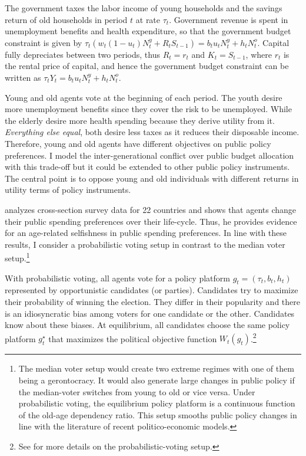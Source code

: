 \documentclass[
]{article}
\begin{document}
The government taxes the labor income of young households and the savings return of old households in period \(t\) at rate \(\tau_t\). Government revenue is spent in unemployment benefits and health expenditure, so that the government budget constraint is given by \(\tau_t\left( w_t(1-u_t)N^y_t + R_t S_{t-1} \right) = b_t u_t N^y_t + h_t N^o_t\). Capital fully depreciates between two periods, thus \(R_t = r_t\) and \(K_t = S_{t-1}\), where \(r_t\) is the rental price of capital, and hence the government budget constraint can be written as \(\tau_t Y_t = b_t u_t N^y_t + h_t N^o_t\).

Young and old agents vote at the beginning of each period. The youth desire more unemployment benefits since they cover the risk to be unemployed. While the elderly desire more health spending because they derive utility from it. \emph{Everything else equal}, both desire less taxes as it reduces their disposable income. Therefore, young and old agents have different objectives on public policy preferences. I model the inter-generational conflict over public budget allocation with this trade-off but it could be extended to other public policy instruments. The central point is to oppose young and old individuals with different returns in utility terms of policy instruments.

\citet{Sorensen2013} analyzes cross-section survey data for 22 countries and shows that agents change their public spending preferences over their life-cycle. Thus, he provides evidence for an age-related selfishness in public spending preferences. In line with these results, I consider a probabilistic voting setup in contrast to the median voter setup.\footnote{The median voter setup would create two extreme regimes with one of them being a gerontocracy. It would also generate large changes in public policy if the median-voter switches from young to old or vice versa. Under probabilistic voting, the equilibrium policy platform is a continuous function of the old-age dependency ratio. This setup smooths public policy changes in line with the literature of recent politico-economic models.}

With probabilistic voting, all agents vote for a policy platform \(g_t = (\tau_t, b_t, h_t)\) represented by opportunistic candidates (or parties). Candidates try to maximize their probability of winning the election. They differ in their popularity and there is an idiosyncratic bias among voters for one candidate or the other. Candidates know about these biases. At equilibrium, all candidates choose the same policy platform \(g_t^\star\) that maximizes the political objective function \(W_t(g_t)\).\footnote{See \citet{Lindbeck1987} for more details on the probabilistic-voting setup.}
\end{document}
